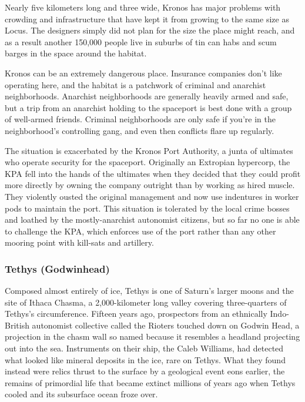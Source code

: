 Nearly five kilometers long and three wide, Kronos 
has major problems with crowding and infrastructure 
that have kept it from growing to the same size as 
Locus. The designers simply did not plan for the size 
the place might reach, and as a result another 150,000 
people live in suburbs of tin can habs and scum barges 
in the space around the habitat. 

Kronos can be an extremely dangerous place. 
Insurance companies don't like operating here, and 
the habitat is a patchwork of criminal and anarchist 
neighborhoods. Anarchist neighborhoods are generally 
heavily armed and safe, but a trip from an anarchist 
holding to the spaceport is best done with a group of 
well-armed friends. Criminal neighborhoods are only 
safe if you're in the neighborhood's controlling gang, 
and even then conflicts flare up regularly.

The situation is exacerbated by the Kronos Port 
Authority, a junta of ultimates who operate security 
for the spaceport. Originally an Extropian hypercorp, 
the KPA fell into the hands of the ultimates when 
they decided that they could profit more directly 
by owning the company outright than by working 
as hired muscle. They violently ousted the original 
management and now use indentures in worker pods 
to maintain the port. This situation is tolerated by 
the local crime bosses and loathed by the mostly-anarchist autonomist citizens, but so far no one is 
able to challenge the KPA, which enforces use of the 
port rather than any other mooring point with kill-sats and artillery.

\subsubsection{Tethys (Godwinhead)}

Composed almost entirely of ice, Tethys is one of Saturn's larger moons and the site of Ithaca Chasma, a 
2,000-kilometer long valley covering three-quarters of 
Tethys's circumference. Fifteen years ago, prospectors 
from an ethnically Indo-British autonomist collective 
called the Rioters touched down on Godwin Head, a 
projection in the chasm wall so named because it resembles a headland projecting out into the sea. Instruments on their ship, the Caleb Williams, had detected 
what looked like mineral deposits in the ice, rare on 
Tethys. What they found instead were relics thrust 
to the surface by a geological event eons earlier, the 
remains of primordial life that became extinct millions 
of years ago when Tethys cooled and its subsurface 
ocean froze over.

